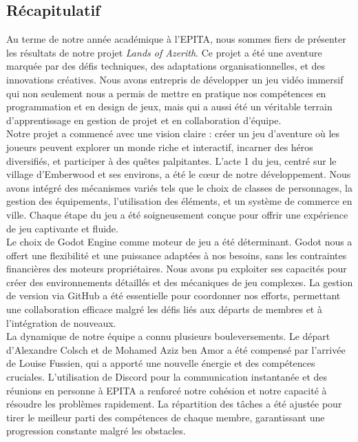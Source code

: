 

\subsection{Récapitulatif}

Au terme de notre année académique à l'EPITA, nous sommes fiers de présenter les résultats de notre projet \textit{Lands of Azerith}.
Ce projet a été une aventure marquée par des défis techniques, des adaptations organisationnelles, et des innovations créatives.
Nous avons entrepris de développer un jeu vidéo immersif qui non seulement nous a permis de mettre en pratique nos compétences en programmation et en design de jeux,
mais qui a aussi été un véritable terrain d'apprentissage en gestion de projet et en collaboration d'équipe.
\\

Notre projet a commencé avec une vision claire : créer un jeu d'aventure où les joueurs peuvent explorer un monde riche et interactif,
incarner des héros diversifiés, et participer à des quêtes palpitantes. L'acte 1 du jeu, centré sur le village d'Emberwood et ses environs,
a été le cœur de notre développement. Nous avons intégré des mécanismes variés tels que le choix de classes de personnages, la gestion des équipements,
l'utilisation des éléments, et un système de commerce en ville. Chaque étape du jeu a été soigneusement conçue pour offrir une expérience de jeu captivante et fluide.
\\

Le choix de Godot Engine comme moteur de jeu a été déterminant. Godot nous a offert une flexibilité et une puissance adaptées à nos besoins,
sans les contraintes financières des moteurs propriétaires. Nous avons pu exploiter ses capacités pour créer des environnements détaillés et
des mécaniques de jeu complexes. La gestion de version via GitHub a été essentielle pour coordonner nos efforts, permettant une collaboration
efficace malgré les défis liés aux départs de membres et à l'intégration de nouveaux.
\\

La dynamique de notre équipe a connu plusieurs bouleversements.
Le départ d'Alexandre Colsch et de Mohamed Aziz ben Amor a été compensé par l'arrivée de Louise Fussien, qui a apporté une nouvelle énergie et des compétences cruciales. L'utilisation de Discord pour la communication instantanée et des réunions en personne à EPITA a renforcé notre cohésion et notre capacité à résoudre les problèmes rapidement.
La répartition des tâches a été ajustée pour tirer le meilleur parti des compétences de chaque membre, garantissant une progression constante malgré les obstacles.
\\

